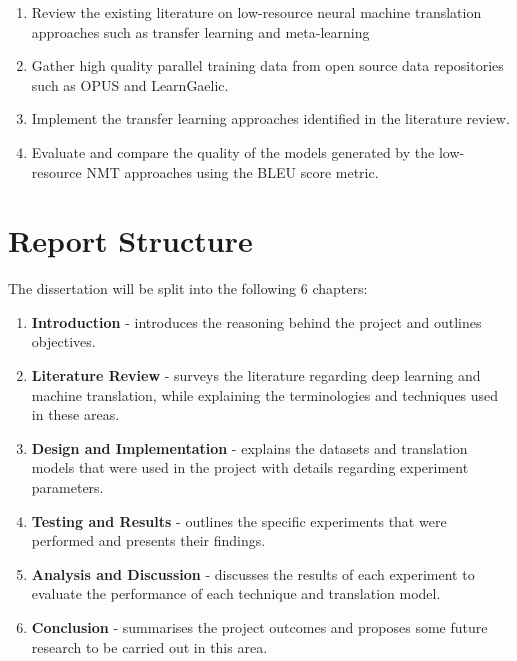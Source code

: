 \begin{enumerate}
  \item Review the existing literature on low-resource neural machine translation approaches such as transfer learning and meta-learning
  \item Gather high quality parallel training data from open source data repositories such as OPUS and LearnGaelic.
  \item Implement the transfer learning approaches identified in the literature review.
  \item Evaluate and compare the quality of the models generated by the low-resource \acrshort{NMT} approaches using the \acrshort{BLEU} score metric.
\end{enumerate}


\section{Report Structure}
The dissertation will be split into the following 6 chapters:
\begin{enumerate}
    \item \textbf{Introduction} - introduces the reasoning behind the project and outlines objectives.
    \item \textbf{Literature Review} - surveys the literature regarding deep learning and machine translation, while explaining the terminologies and techniques used in these areas.
    \item \textbf{Design and Implementation} - explains the datasets and translation models that were used in the project with details regarding experiment parameters.
    \item \textbf{Testing and Results} - outlines the specific experiments that were performed and presents their findings.
    \item \textbf{Analysis and Discussion} - discusses the results of each experiment to evaluate the performance of each technique and translation model.
    \item \textbf{Conclusion} - summarises the project outcomes and proposes some future research to be carried out in this area.
\end{enumerate}